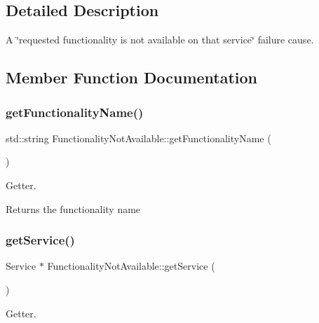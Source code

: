\subsection{Detailed Description}
A \char`\"{}requested functionality is not available on that service\char`\"{} failure cause. 

\subsection{Member Function Documentation}
\mbox{\label{class_functionality_not_available_af76d66ef74d486ec9eb403326aa10084}} 
\subsubsection{\texorpdfstring{get\+Functionality\+Name()}{getFunctionalityName()}}
{\footnotesize\ttfamily std\+::string Functionality\+Not\+Available\+::get\+Functionality\+Name (\begin{DoxyParamCaption}{ }\end{DoxyParamCaption})}



Getter. 

\begin{DoxyReturn}{Returns}
the functionality name 
\end{DoxyReturn}
\mbox{\label{class_functionality_not_available_ac356ec72727c405f3a77d2a966312ca1}} 
\subsubsection{\texorpdfstring{get\+Service()}{getService()}}
{\footnotesize\ttfamily Service $\ast$ Functionality\+Not\+Available\+::get\+Service (\begin{DoxyParamCaption}{ }\end{DoxyParamCaption})}



Getter. 

